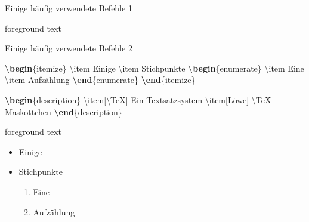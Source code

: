 \documentclass[aspectratio=169]{beamer}
\newenvironment{Shaded}{\begin{snugshade}}{\end{snugshade}}
\newcommand{\ExtensionTok}[1]{\textcolor[rgb]{0.25,0.67,0.19}{#1}}
\newcommand{\FunctionTok}[1]{\textcolor[rgb]{0.34,0.51,0.35}{#1}}
\newcommand{\KeywordTok}[1]{\textcolor[rgb]{0.25,0.67,0.19}{\textbf{#1}}}
\newcommand{\NormalTok}[1]{\textcolor[rgb]{0.19,0.19,0.19}{#1}}
\newenvironment{Shaded}{}{}
\begin{document}
\begin{frame}[fragile]{Einige häufig verwendete Befehle 1}
\begin{minipage}{0.33\textwidth}
\begin{OutputBox}
\begin{beamercolorbox}{foreground text}
            \end{beamercolorbox}
        \end{OutputBox}
    \egroup

    \end{minipage}
    \end{frame}

    \begin{frame}[fragile]{Einige häufig verwendete Befehle 2}
    \protect\hypertarget{einige-huxe4ufig-verwendete-befehle-2}{}
    \begin{minipage}{0.66\textwidth}

\begin{Shaded}
\begin{Highlighting}[]
\KeywordTok{\textbackslash{}begin}\NormalTok{\{}\ExtensionTok{itemize}\NormalTok{\}}
    \FunctionTok{\textbackslash{}item}\NormalTok{ Einige}
    \FunctionTok{\textbackslash{}item}\NormalTok{ Stichpunkte}
    \KeywordTok{\textbackslash{}begin}\NormalTok{\{}\ExtensionTok{enumerate}\NormalTok{\}}
        \FunctionTok{\textbackslash{}item}\NormalTok{ Eine}
        \FunctionTok{\textbackslash{}item}\NormalTok{ Aufzählung}
    \KeywordTok{\textbackslash{}end}\NormalTok{\{}\ExtensionTok{enumerate}\NormalTok{\}}
\KeywordTok{\textbackslash{}end}\NormalTok{\{}\ExtensionTok{itemize}\NormalTok{\}}

\KeywordTok{\textbackslash{}begin}\NormalTok{\{}\ExtensionTok{description}\NormalTok{\}}
    \FunctionTok{\textbackslash{}item}\NormalTok{[}\FunctionTok{\textbackslash{}TeX}\NormalTok{] Ein Textsatzsystem }
    \FunctionTok{\textbackslash{}item}\NormalTok{[Löwe] }\FunctionTok{\textbackslash{}TeX}\NormalTok{ Maskottchen }
\KeywordTok{\textbackslash{}end}\NormalTok{\{}\ExtensionTok{description}\NormalTok{\}}
\end{Highlighting}
\end{Shaded}

    \end{minipage}\begin{minipage}{0.33\textwidth}

    \bgroup 
        \begin{OutputBox}
        \begin{beamercolorbox}{foreground text}
            \selectfont%

    \begin{itemize}
        \item Einige
        \item Stichpunkte
        \begin{enumerate}
            \item Eine
            \item Aufzählung
        \end{enumerate}
    \end{itemize}


\end{beamercolorbox}
\end{OutputBox}
\end{minipage}
\end{frame}
\end{document}
